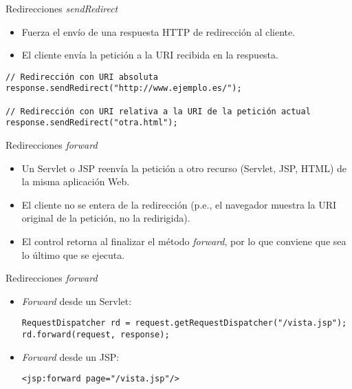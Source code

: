 \begin{slide}{Redirecciones \emph{sendRedirect}}
  \begin{itemize}
  \item Fuerza el envío de una respuesta HTTP de redirección al cliente.
  \item El cliente envía la petición a la URI recibida en la respuesta.
  \end{itemize}

\begin{Verbatim}[fontfamily=tt,fontsize=\fontsize{8}{8}]
// Redirección con URI absoluta
response.sendRedirect("http://www.ejemplo.es/");

// Redirección con URI relativa a la URI de la petición actual
response.sendRedirect("otra.html");
\end{Verbatim}
\end{slide}

\begin{slide}{Redirecciones \emph{forward}}
  \begin{itemize}
  \item Un Servlet o JSP reenvía la petición a otro recurso (Servlet,
    JSP, HTML) de la
    misma aplicación Web.
  \item El cliente no se entera de la redirección (p.e., el navegador
    muestra la URI original de la petición, no la redirigida).
  \item El control retorna al finalizar el método \emph{forward},
    por lo que conviene que sea lo último que se ejecuta.
  \end{itemize}

\end{slide}

\begin{slide}{Redirecciones \emph{forward}}
  \begin{itemize}
  \item \emph{Forward} desde un Servlet:

\begin{Verbatim}[fontfamily=tt,fontsize=\fontsize{8}{8}]
RequestDispatcher rd = request.getRequestDispatcher("/vista.jsp");
rd.forward(request, response);
\end{Verbatim}

\item \emph{Forward} desde un JSP:

\begin{Verbatim}[fontfamily=tt,fontsize=\fontsize{8}{8}]
<jsp:forward page="/vista.jsp"/>
\end{Verbatim}

\end{itemize}
\end{slide}

